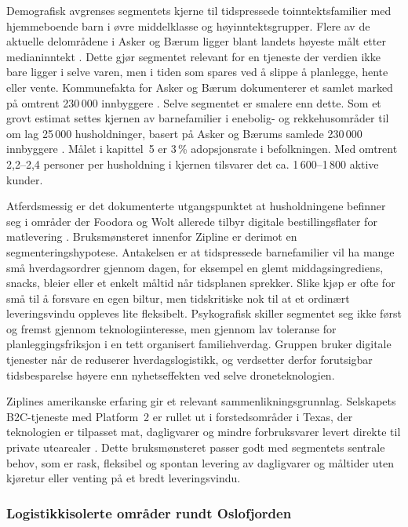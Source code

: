 Demografisk avgrenses segmentets kjerne til tidspressede
toinntektsfamilier med hjemmeboende barn i øvre middelklasse og
høyinntektsgrupper. Flere av de aktuelle delområdene i Asker og Bærum ligger
blant landets høyeste målt etter medianinntekt \parencite{omholt2023_ssb}.
Dette gjør segmentet relevant for en tjeneste der verdien ikke bare ligger i
selve varen, men i tiden som spares ved å slippe å planlegge, hente eller
vente. Kommunefakta for Asker og Bærum dokumenterer et samlet marked på
omtrent 230\,000 innbyggere \parencite{ssb_kommunefakta_asker,
ssb_kommunefakta_baerum}. Selve segmentet er smalere enn dette. Som et grovt estimat settes kjernen av
barnefamilier i enebolig- og rekkehusområder til om lag 25\,000
husholdninger, basert på Asker og Bærums samlede 230\,000 innbyggere
\parencite{ssb_kommunefakta_asker, ssb_kommunefakta_baerum}. Målet i
kapittel~5 er 3\,\% adopsjonsrate i befolkningen. Med omtrent
2{,}2--2{,}4 personer per husholdning i kjernen tilsvarer det ca.
1\,600--1\,800 aktive kunder.

Atferdsmessig er det dokumenterte utgangspunktet at husholdningene befinner
seg i områder der Foodora og Wolt allerede tilbyr digitale bestillingsflater
for matlevering \parencite{foodora2026_byer, wolt2026_asker_sandvika}.
Bruksmønsteret innenfor Zipline er derimot en segmenteringshypotese. Antakelsen
er at tidspressede barnefamilier vil ha mange små hverdagsordrer gjennom dagen,
for eksempel en glemt middagsingrediens, snacks, bleier eller et enkelt måltid
når tidsplanen sprekker. Slike kjøp er ofte for små til å forsvare en egen
biltur, men tidskritiske nok til at et ordinært leveringsvindu oppleves lite
fleksibelt. Psykografisk skiller segmentet seg ikke først og fremst gjennom
teknologiinteresse, men gjennom lav toleranse for planleggingsfriksjon i en
tett organisert familiehverdag. Gruppen bruker digitale tjenester når de
reduserer hverdagslogistikk, og verdsetter derfor forutsigbar tidsbesparelse
høyere enn nyhetseffekten ved selve droneteknologien.

Ziplines amerikanske erfaring gir et relevant sammenlikningsgrunnlag.
Selskapets B2C-tjeneste med Platform~2 er rullet ut i forstedsområder i
Texas, der teknologien er tilpasset mat, dagligvarer og mindre
forbruksvarer levert direkte til private utearealer \parencite{stevens2025}.
Dette bruksmønsteret passer godt med segmentets sentrale behov, som er rask,
fleksibel og spontan levering av dagligvarer og måltider uten kjøretur eller
venting på et bredt leveringsvindu.

\subsubsection{Logistikkisolerte områder rundt Oslofjorden}

